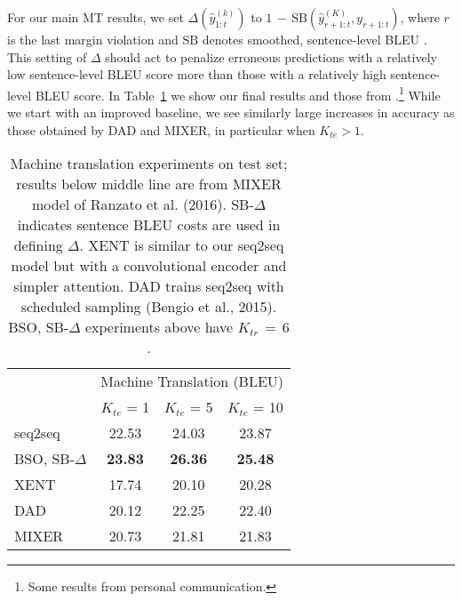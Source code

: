\documentclass[11pt,letterpaper]{article}
\newcommand{\beampred}[2]{\ensuremath{\hat{y}_{1:{#1}}^{({#2})}}}
\newcommand{\niceq}{\ensuremath{\,{=}\,}}
\begin{document}
For our main MT results, we set $\Delta(\beampred{t}{k})$ to $1 \,{-}\,\mathrm{SB}(\hat{y}_{r+1:t}^{({K})}, y_{r+1:t})$, where $r$ is the last margin violation and $\mathrm{SB}$ denotes smoothed, sentence-level BLEU \cite{chen14systematic}. This setting of $\Delta$ should act to penalize erroneous predictions with a relatively low sentence-level BLEU score more than those with a relatively high sentence-level BLEU score. In Table~\ref{tab:mtfinal} we show our final results and those from .\footnote{Some results from personal communication.} While we start with an improved baseline, we see similarly large increases in accuracy as those obtained by DAD and MIXER, in particular when $K_{te} > 1$. 

\begin{table}[t!]
  \centering
  \begin{tabular}{lccc}
    \toprule
    & \multicolumn{3}{c}{Machine Translation (BLEU) } \\ 
    &  $K_{te}$ = 1 & $K_{te}$ = 5 & $K_{te}$ = 10 \\ 
    \midrule
    seq2seq & 22.53 & 24.03 & 23.87 \\
    BSO, SB-$\Delta$ & \textbf{23.83} & \textbf{26.36} & \textbf{25.48} \\
    \midrule
    XENT & 17.74 & 20.10 & 20.28 \\
    DAD & 20.12 & 22.25 & 22.40 \\ 
    MIXER & 20.73 & 21.81 & 21.83 \\    
    \bottomrule
  \end{tabular}
  \caption{Machine translation experiments on test set; results below middle line are from MIXER model of Ranzato et al. (2016). SB-$\Delta$ indicates sentence BLEU costs are used in defining $\Delta$.  XENT is similar to our seq2seq model but with a convolutional encoder and simpler attention. DAD trains seq2seq with scheduled sampling (Bengio et al., 2015). BSO, SB-$\Delta$ experiments above have $K_{tr} \niceq 6$.}
  \label{tab:mtfinal}
\end{table}
\end{document}
